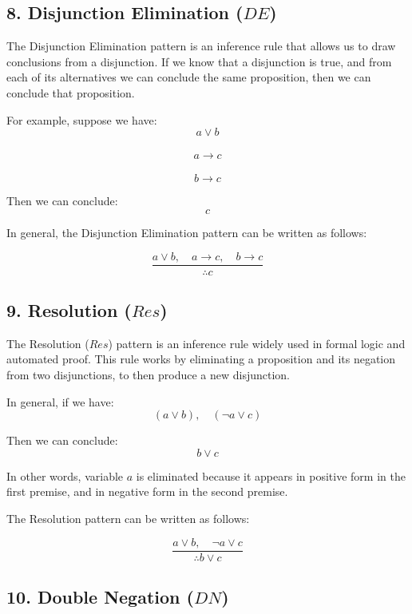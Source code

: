 \subsection{\texorpdfstring{8. Disjunction Elimination
(\(DE\))}{8. Disjunction Elimination (DE)}}\label{disjunction-elimination-de}

The Disjunction Elimination pattern is an inference rule that allows us
to draw conclusions from a disjunction. If we know that a disjunction is
true, and from each of its alternatives we can conclude the same
proposition, then we can conclude that proposition.

For example, suppose we have:\\
\[a \lor b\]\\
\[a \rightarrow c\]\\
\[b \rightarrow c\]

Then we can conclude:\\
\[c\]

In general, the Disjunction Elimination pattern can be written as
follows:

\[
\frac{a \lor b, \quad a \rightarrow c, \quad b \rightarrow c}{\therefore c}
\]

\subsection{\texorpdfstring{9. Resolution
(\(Res\))}{9. Resolution (Res)}}\label{resolution-res}

The Resolution (\(Res\)) pattern is an inference rule widely used in
formal logic and automated proof. This rule works by eliminating a
proposition and its negation from two disjunctions, to then produce a
new disjunction.

In general, if we have:\\
\[(a \lor b), \quad (\lnot a \lor c)\]

Then we can conclude:\\
\[b \lor c\]

In other words, variable \(a\) is eliminated because it appears in
positive form in the first premise, and in negative form in the second
premise.

The Resolution pattern can be written as follows:

\[
\frac{a \lor b, \quad \lnot a \lor c}{\therefore b \lor c}
\]

\subsection{\texorpdfstring{10. Double Negation
(\(DN\))}{10. Double Negation (DN)}}\label{double-negation-dn}

